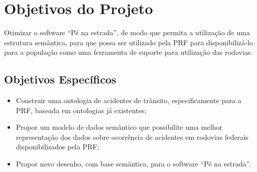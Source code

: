 \section{Objetivos do Projeto}

Otimizar o software “Pé na estrada”, de modo que permita a utilização de uma
estrutura semântica, para que possa ser utilizado pela PRF para disponibilizá-lo para a
população como uma ferramenta de suporte para utilização das rodovias.

\subsection{Objetivos Específicos}

\begin{itemize}
 \item Construir uma ontologia de acidentes de trânsito, especificamente para a
PRF, baseada em ontologias já existentes;
  \item Propor um modelo de dados semântico que possibilite uma melhor
representação dos dados sobre ocorrência de acidentes em rodovias federais
disponibilizados pela PRF;
  \item Propor novo desenho, com base semântica, para o software “Pé na estrada”.
\end{itemize}
